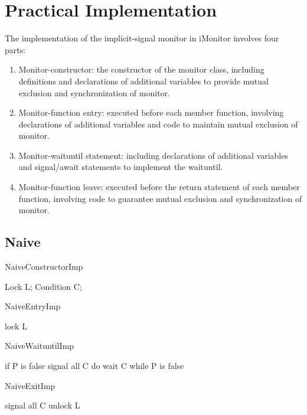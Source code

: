\documentclass[10pt, conference, compsocconf]{IEEEtran}
\begin{document}
\section{Practical Implementation} \label{sec:imp}
The implementation of the implicit-signal monitor in iMonitor involves four 
parts:
\begin{enumerate}
  \item Monitor-constructor: the constructor of the monitor class, including 
    definitions and declarations of additional variables to provide mutual 
    exclusion and synchronization of monitor. 
  \item Monitor-function entry: executed before each member function, 
    involving declarations of additional variables and code to maintain
    mutual exclusion of monitor. 
  \item Monitor-waituntil statement: including declarations of additional
    variables and signal/await statements to implement the waituntil.
  \item Monitor-function leave: executed before the return statement of 
    each member function, involving code to guarantee mutual exclusion and 
    synchronization of monitor. 
\end{enumerate}



\subsection{Naive}

\begin{SaveVerbatim}{NaiveConstructorImp}

Lock L;
Condition C;
\end{SaveVerbatim}

\begin{SaveVerbatim}{NaiveEntryImp}

lock L 
\end{SaveVerbatim}

\begin{SaveVerbatim}{NaiveWaituntilImp}

if P is false
  signal all C
  do 
    wait C
  while P is false
\end{SaveVerbatim}

\begin{SaveVerbatim}{NaiveExitImp}

signal all C
unlock L
\end{SaveVerbatim}
\end{document}

